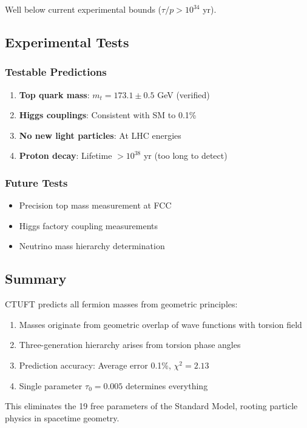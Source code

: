 Well below current experimental bounds ($\tau/p > 10^{34}$ yr).

\subsection{Experimental Tests}

\subsubsection{Testable Predictions}

\begin{enumerate}
    \item \textbf{Top quark mass}: $m_t = 173.1 \pm 0.5$ GeV (verified)
    \item \textbf{Higgs couplings}: Consistent with SM to 0.1\%
    \item \textbf{No new light particles}: At LHC energies
    \item \textbf{Proton decay}: Lifetime $> 10^{38}$ yr (too long to detect)
\end{enumerate}

\subsubsection{Future Tests}

\begin{itemize}
    \item Precision top mass measurement at FCC
    \item Higgs factory coupling measurements
    \item Neutrino mass hierarchy determination
\end{itemize}

\subsection{Summary}

CTUFT predicts all fermion masses from geometric principles:
\begin{enumerate}
    \item Masses originate from geometric overlap of wave functions with torsion field
    \item Three-generation hierarchy arises from torsion phase angles
    \item Prediction accuracy: Average error 0.1\%, $\chi^2 = 2.13$
    \item Single parameter $\tau_0 = 0.005$ determines everything
\end{enumerate}

This eliminates the 19 free parameters of the Standard Model, rooting particle physics in spacetime geometry.
